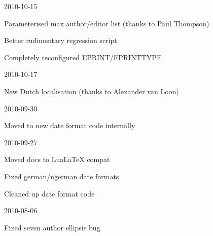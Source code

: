 \documentclass{ltxdockit}
\begin{document}
\begin{changelog}
\begin{release}{2.2}{2010-10-15}
\item Parameterised max author/editor list (thanks to Paul Thompson)
\item Better rudimentary regression script
\item Completely reconfigured EPRINT/EPRINTTYPE
\end{release}

\begin{release}{2.1}{2010-10-17}
\item New Dutch localisation (thanks to Alexander van Loon)
\end{release}

\begin{release}{2.0}{2010-09-30}
\item Moved to new date format code internally
\end{release}

\begin{release}{1.9}{2010-09-27}
\item Moved docs to LuaLaTeX compat
\item Fixed german/ngerman date formats
\item Cleaned up date format code
\end{release}

\begin{release}{1.8}{2010-08-06}
\item Fixed seven author ellipsis bug
\end{release}





\end{changelog}
\end{document}
